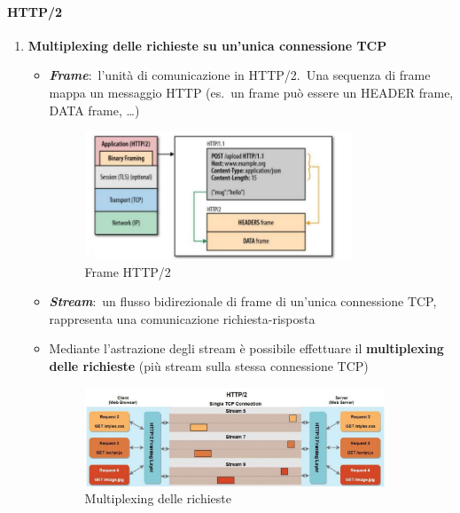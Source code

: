 \paragraph{HTTP/2}
\begin{enumerate}
    \item \textbf{Multiplexing delle richieste su un'unica connessione TCP}
          \begin{itemize}
              \item \textbf{\emph{Frame}}:\ l'unità di comunicazione in HTTP/2.\ Una sequenza di frame mappa un messaggio HTTP (es.\ un frame può essere un HEADER frame, DATA frame, \dots)
                    \begin{figure}[H]
                        \centering
                        \includegraphics[width = 0.8\textwidth]{immagini/HTTP_2.jpg}
                        \caption*{Frame HTTP/2}
                    \end{figure}
              \item \textbf{\emph{Stream}}:\ un flusso bidirezionale di frame di un'unica connessione TCP, rappresenta una comunicazione richiesta-risposta
              \item Mediante l'astrazione degli stream è possibile effettuare il \textbf{multiplexing delle richieste} (più stream sulla stessa connessione TCP)
                    \begin{figure}[H]
                        \centering
                        \includegraphics[width = 0.9\textwidth]{immagini/HTTP_2_stream.jpg}
                        \caption*{Multiplexing delle richieste}
                    \end{figure}

\end{itemize}
\end{enumerate}
